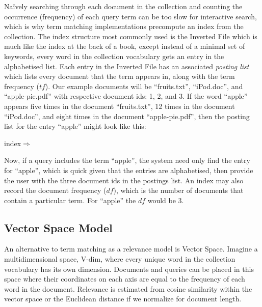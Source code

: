 
Na{\"i}vely searching through each document in the collection and counting the occurrence (frequency) of each query term can be too slow for interactive search, which is why term matching implementations precompute an index from the collection. The index structure most commonly used is the Inverted File which is much like the index at the back of a book, except instead of a minimal set of keywords, every word in the collection vocabulary gets an entry in the alphabetised list. Each entry in the Inverted File has an associated \textit{posting list} which lists every document that the term appears in, along with the term frequency ($\mathit{tf}$). Our example documents will be ``fruits.txt'', ``iPod.doc'', and ``apple-pie.pdf'' with respective document ids: 1, 2, and 3. If the word ``apple'' appears five times in the document ``fruits.txt'', 12 times in the document ``iPod.doc'', and eight times in the document ``apple-pie.pdf'', then the posting list for the entry ``apple'' might look like this:

\begin{center}
    index $\Rightarrow$ \big[ (1, 5), (2, 12), (3, 8) \big]
\end{center}

Now, if a query includes the term ``apple'', the system need only find the entry for ``apple'', which is quick given that the entries are alphabetised, then provide the user with the three document ids in the postings list. An index may also record the document frequency ($\mathit{df}$), which is the number of documents that contain a particular term. For ``apple'' the $\mathit{df}$ would be 3.

\subsection{Vector Space Model} 
An alternative to term matching as a relevance model is Vector Space. Imagine a multidimensional space, V-dim, where every unique word in the collection vocabulary has its own dimension. Documents and queries can be placed in this space where their coordinates on each axis are equal to the frequency of each word in the document. Relevance is estimated from cosine similarity within the vector space or the Euclidean distance if we normalize for document length. 


